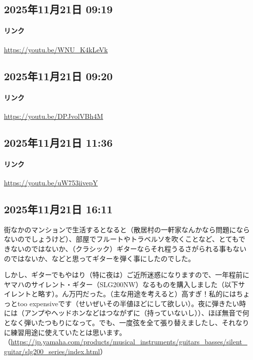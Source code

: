 \subsection*{2025年11月21日 09:19}

\paragraph{リンク}
\url{https://youtu.be/WNU_K4kLeVk}

\subsection*{2025年11月21日 09:20}

\paragraph{リンク}
\url{https://youtu.be/DPJvolVBh4M}

\subsection*{2025年11月21日 11:36}

\paragraph{リンク}
\url{https://youtu.be/uW753iivepY}

\subsection*{2025年11月21日 16:11}

街なかのマンションで生活するとなると（散居村の一軒家なんかなら問題にならないのでしょうけど）、部屋でフルートやトラベルソを吹くことなど、とてもできないのではないか、（クラシック）ギターならそれ程うるさがられる事もないのではないか、などと思ってギターを弾く事にしたのでした。

しかし、ギターでもやはり（特に夜は）ご近所迷惑になりますので、一年程前にヤマハのサイレント・ギター（SLG200NW）なるものを購入しました（以下サイレントと略す）。ん万円だった。（主な用途を考えると）高すぎ！私的にはちょっとtoo expensiveです（せいぜいその半値ほどにして欲しい）。夜に弾きたい時には（アンプやヘッドホンなどはつながずに（持っていないし））、ほぼ無音で何となく弾いたつもりになって。でも、一度弦を全て張り替えましたし、それなりに練習用途に使えていたとは思います。（\url{https://jp.yamaha.com/products/musical_instruments/guitars_basses/silent_guitar/slg200_series/index.html}）

